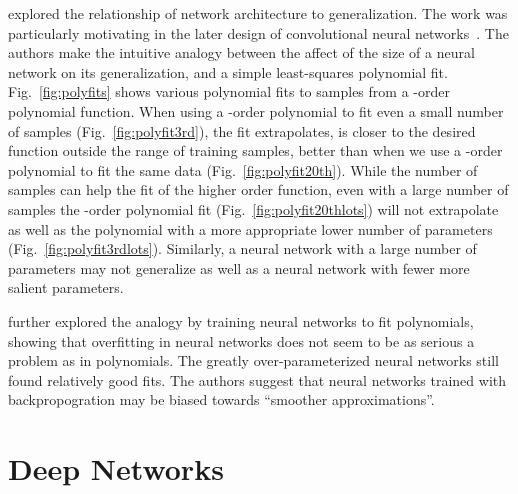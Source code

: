 \documentclass[thesis]{subfiles}
\begin{document}
	\citet{denker1987large} explored the relationship of network architecture to generalization. The work was particularly motivating in the later design of convolutional neural networks~\citep{lecun1989generalization, lecun1989backpropagation}. The authors make the intuitive analogy between the affect of the size of a neural network on its generalization, and a simple least-squares polynomial fit. Fig.~\ref{fig:polyfits} shows various polynomial fits to samples from a -order polynomial function. When using a -order polynomial to fit even a small number of samples (Fig.~\ref{fig:polyfit3rd}), the fit extrapolates, \ie is closer to the desired function outside the range of training samples, better than when we use a -order polynomial to fit the same data (Fig.~\ref{fig:polyfit20th}). While the number of samples can help the fit of the higher order function, even with a large number of samples the -order polynomial fit  (Fig.~\ref{fig:polyfit20thlots}) will not extrapolate as well as the polynomial with a more appropriate lower number of parameters (Fig.~\ref{fig:polyfit3rdlots}). Similarly, a neural network with a large number of parameters may not generalize as well as a neural network with fewer more salient parameters.
    
    \citet{caruana2001overfitting} further explored the analogy by training neural networks to fit polynomials, showing that overfitting in neural networks does not seem to be as serious a problem as in polynomials. The greatly over-parameterized neural networks still found relatively good fits. The authors suggest that neural networks trained with backpropogration may be biased towards ``smoother approximations''.
    
    \section{Deep Networks}
	\citep{Krizhevsky2012}
	\citep{Simonyan2014verydeep}
	\citep{He2015}
	\citep{He2016}
    
	
	
\end{document}
